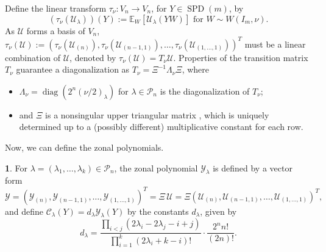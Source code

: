 \documentclass{mathincs}
\numberwithin{equation}{section}
\numberwithin{figure}{section}
\theoremstyle{plain}
\theoremstyle{definition}
\newtheorem{defn}[thm]{\protect\definitionname}
\theoremstyle{remark}
\theoremstyle{plain}
\theoremstyle{definition}
\theoremstyle{plain}
\theoremstyle{plain}
\DeclareMathOperator{\diag}{diag}
\newcommand{\SPD}{\operatorname{SPD}}
\providecommand{\definitionname}{Definition}
\begin{document}
\noindent
Define the linear transform $\tau_{\nu}\colon V_{n}\longrightarrow V_{n}$,
for $Y\in \SPD(m)$, by
\[
  \left(\tau_{\nu}(\mathcal{U}_{\lambda})\right)\left(Y\right) :=
  \mathbb{E}_{W}\left[\mathcal{U}_{\lambda}(YW)\right]\text{ for }W\sim W(I_m,\nu).
\]
As $\mathcal{U}$ forms a basis of $V_{n}$, $\tau_{\nu}(\mathcal{U}):=\left(\tau_{\nu}(\mathcal{U}_{\left(n\right)}),\tau_{\nu}(\mathcal{U}_{\left(n-1,1\right)}),\ldots,\tau_{\nu}(\mathcal{U}_{\left(1,\ldots,1\right)})\right)^{T}$
must be a linear combination of $\mathcal{U}$,
denoted by $\tau_{\nu}(\mathcal{U})=T_{\nu}\mathcal{U}$. 
Properties of the transition matrix $T_{\nu}$ guarantee a diagonalization as $T_{\nu}=\Xi^{-1}\Lambda_{\nu}\Xi$, where 
\begin{itemize}
\item $\Lambda_{\nu}=\diag\left(2^{n}\left(\nu/2\right)_{\lambda}\right)$ for $\lambda\in\mathcal{P}_n$ is the diagonalization of $T_\nu$; 
\item and $\Xi$ is a nonsingular upper triangular matrix , which is uniquely
determined up to a (possibly different) multiplicative constant for
each row.
\end{itemize} 
Now, we can define the zonal polynomials.
\begin{defn}
For $\lambda=\left(\lambda_1,\ldots,\lambda_k\right)\in\mathcal{P}_{n}$, the zonal polynomial $\mathcal{Y}_{\lambda}$
is defined by a vector form
\begin{equation}\label{eq:ZonalY}
\mathcal{Y}=\left(\mathcal{Y}_{\left(n\right)}, \mathcal{Y}_{\left(n-1,1\right)}, \ldots, 
\mathcal{Y}_{\left(1,\ldots,1\right)}\right)^T
=\Xi\,\mathcal{U}=\Xi\left(\mathcal{U}_{\left(n\right)}, \mathcal{U}_{\left(n-1,1\right)}, \ldots, \mathcal{U}_{\left(1,\ldots,1\right)}
\right)^T,
\end{equation}
and define $\mathcal{C}_{\lambda}(Y)=d_{\lambda}\mathcal{Y}_{\lambda}(Y)$ by the constants $d_\lambda$, given by
\[
  d_{\lambda}=\frac{\prod_{i<j}\left(2\lambda_{i}-2\lambda_{j}-i+j\right)}{\prod_{i=1}^k\left(2\lambda_{i}+k-i\right)!}
  \cdot\frac{2^{n}n!}{\left(2n\right)!}.
\]
\end{defn}
\end{document}
